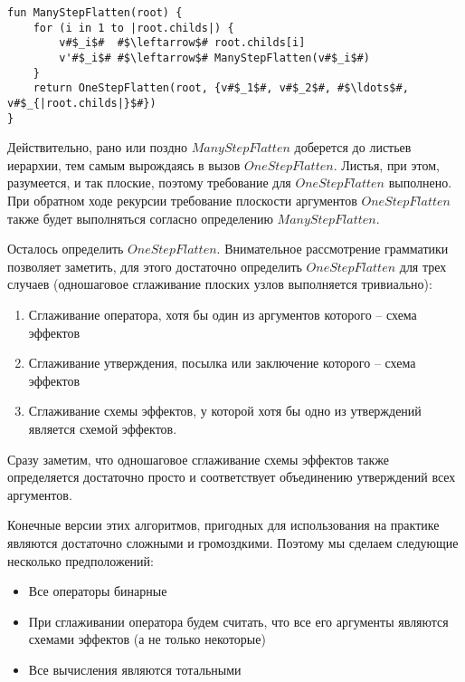 \begin{verbatim}
fun ManyStepFlatten(root) {
    for (i in 1 to |root.childs|) {
        v#$_i$#  #$\leftarrow$# root.childs[i]
        v'#$_i$# #$\leftarrow$# ManyStepFlatten(v#$_i$#) 
    }
    return OneStepFlatten(root, {v#$_1$#, v#$_2$#, #$\ldots$#, v#$_{|root.childs|}$#})
}
\end{verbatim}

Действительно, рано или поздно $ManyStepFlatten$ доберется до листьев иерархии, тем самым вырождаясь в вызов $OneStepFlatten$. Листья, при этом, разумеется, и так плоские, поэтому требование для $OneStepFlatten$ выполнено. При обратном ходе рекурсии требование плоскости аргументов $OneStepFlatten$ также будет выполняться согласно определению $ManyStepFlatten$. 

Осталось определить $OneStepFlatten$. Внимательное рассмотрение грамматики позволяет заметить, для этого достаточно определить $OneStepFlatten$ для трех случаев (одношаговое сглаживание плоских узлов выполняется тривиально):

\begin{enumerate}   
    \item Сглаживание оператора, хотя бы один из аргументов которого -- схема эффектов
    
    \item Сглаживание утверждения, посылка или заключение которого -- схема эффектов
    
    \item Сглаживание схемы эффектов, у которой хотя бы одно из утверждений является схемой эффектов.
\end{enumerate}

Сразу заметим, что одношаговое сглаживание схемы эффектов также определяется достаточно просто и соответствует объединению утверждений всех аргументов. 

Конечные версии этих алгоритмов, пригодных для использования на практике являются достаточно сложными и громоздкими. Поэтому мы сделаем следующие несколько предположений:

\begin{itemize}
    \item Все операторы бинарные
    
    \item При сглаживании оператора будем считать, что все его аргументы являются схемами эффектов (а не только некоторые)
    
    \item Все вычисления являются тотальными
\end{itemize}

